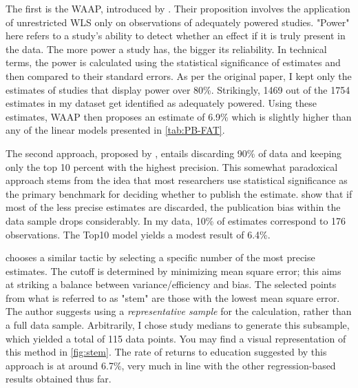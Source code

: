 The first is the \ac{WAAP}, introduced by \cite{Ioannidis2017Waap}. Their proposition involves the application of unrestricted \ac{WLS} only on observations of adequately powered studies. "Power" here refers to a study's ability to detect whether an effect if it is truly present in the data. The more power a study has, the bigger its reliability. In technical terms, the power is calculated using the statistical significance of estimates and then compared to their standard errors. As per the original paper, I kept only the estimates of studies that display power over 80\%. Strikingly, 1469 out of the 1754 estimates in my dataset get identified as adequately powered. Using these estimates, \ac{WAAP} then proposes an estimate of 6.9\% which is slightly higher than any of the linear models presented in \autoref{tab:PB-FAT}.

The second approach, proposed by \cite{Stanley2010Top}, entails discarding 90\% of data and keeping only the top 10 percent with the highest precision. This somewhat paradoxical approach stems from the idea that most researchers use statistical significance as the primary benchmark for deciding whether to publish the estimate. \cite{Stanley2010Top} show that if most of the less precise estimates are discarded, the publication bias within the data sample drops considerably. In my data, 10\% of estimates correspond to 176 observations. The Top10 model yields a modest result of 6.4\%.

\cite{Furukawa2019Stem} chooses a similar tactic by selecting a specific number of the most precise estimates. The cutoff is determined by minimizing mean square error; this aims at striking a balance between variance/efficiency and bias. The selected points from what is referred to as "stem" are those with the lowest mean square error. The author suggests using a \textit{representative sample} for the calculation, rather than a full data sample. Arbitrarily, I chose study medians to generate this subsample, which yielded a total of 115 data points. You may find a visual representation of this method in \autoref{fig:stem}. The rate of returns to education suggested by this approach is at around 6.7\%, very much in line with the other regression-based results obtained thus far.

